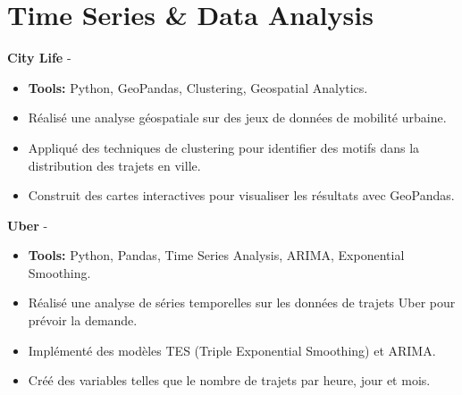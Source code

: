 \documentclass[a4paper,11pt]{article}%
\begin{document}
\section*{Time Series \& Data Analysis}%
%
\noindent \textbf{City Life} - \href{https://github.com/sboof911/City-Life}{{}}%
\begin{itemize}[leftmargin=2em,parsep=0pt,topsep=1em]%
\item[] \textbf{Tools:} Python, GeoPandas, Clustering, Geospatial Analytics.%
\item R\'ealis\'e une analyse g\'eospatiale sur des jeux de donn\'ees de mobilit\'e urbaine.%
\item Appliqu\'e des techniques de clustering pour identifier des motifs dans la distribution des trajets en ville.%
\item Construit des cartes interactives pour visualiser les r\'esultats avec GeoPandas.%
\end{itemize}%
%
\noindent \textbf{Uber} - \href{https://github.com/sboof911/Uber}{{}}%
\begin{itemize}[leftmargin=2em,parsep=0pt,topsep=1em]%
\item[] \textbf{Tools:} Python, Pandas, Time Series Analysis, ARIMA, Exponential Smoothing.%
\item R\'ealis\'e une analyse de s\'eries temporelles sur les donn\'ees de trajets Uber pour pr\'evoir la demande.%
\item Impl\'ement\'e des mod\`eles TES (Triple Exponential Smoothing) et ARIMA.%
\item Cr\'e\'e des variables telles que le nombre de trajets par heure, jour et mois.%
\end{itemize}%
%
\end{document}
